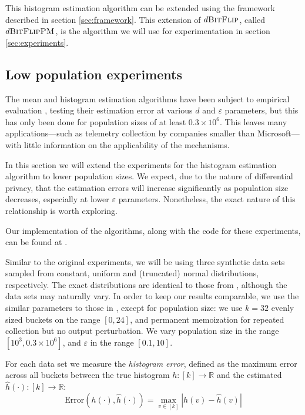 \documentclass[a4paper,12pt]{article}
\renewcommand{\epsilon}{\varepsilon}
\begin{document}
This histogram estimation algorithm can be extended using the framework described in section \ref{sec:framework}. This extension of $d\textsc{BitFlip}$, called $d\textsc{BitFlipPM}$, is the algorithm we will use for experimentation in section \ref{sec:experiments}.

\subsection{Low population experiments \label{sec:experiments}}

The mean and histogram estimation algorithms have been subject to empirical evaluation \cite[sec.~5]{microsoft_telemetry}, testing their estimation error at various $d$ and $\epsilon$ parameters, but this has only been done for population sizes of at least $0.3\times 10^6$. This leaves many applications---such as telemetry collection by companies smaller than Microsoft---with little information on the applicability of the mechanisms.

In this section we will extend the experiments for the histogram estimation algorithm to lower population sizes. We expect, due to the nature of differential privacy, that the estimation errors will increase significantly as population size decreases, especially at lower $\epsilon$ parameters. Nonetheless, the exact nature of this relationship is worth exploring.

Our implementation of the algorithms, along with the code for these experiments, can be found at \cite{git_repo}.

Similar to the original experiments, we will be using three synthetic data sets sampled from constant, uniform and (truncated) normal distributions, respectively. The exact distributions are identical to those from \cite{microsoft_telemetry}, although the data sets may naturally vary. In order to keep our results comparable, we use the similar parameters to those in \cite{microsoft_telemetry}, except for population size: we use $k=32$ evenly sized buckets on the range $[0,24]$, and permanent memoization for repeated collection but no output perturbation. We vary population size in the range $[10^3, 0.3 \times 10^6]$, and $\epsilon$ in the range $[0.1, 10]$.

For each data set we measure the \emph{histogram error}, defined as the maximum error across all buckets between the true histogram $h : [k] \to \mathbb{R}$ and the estimated $\hat{h}(\cdot) : [k] \to \mathbb{R}$:
\begin{equation*}
    \text{Error}\left(h(\cdot), \hat{h}(\cdot)\right) = \max_{v\in [k]} |h(v) - \hat{h}(v)|
\end{equation*}
\end{document}
